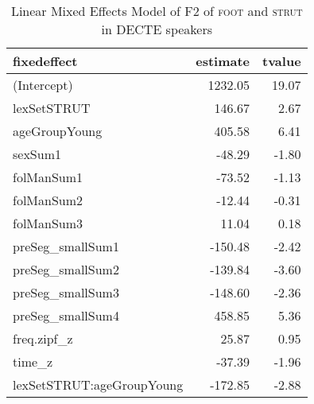 \begin{table}[ht]
\centering
\begin{tabular}{lrr}
  \hline
fixedeffect & estimate & tvalue \\ 
  \hline
(Intercept) & 1232.05 & 19.07 \\ 
  lexSetSTRUT & 146.67 & 2.67 \\ 
  ageGroupYoung & 405.58 & 6.41 \\ 
  sexSum1 & -48.29 & -1.80 \\ 
  folManSum1 & -73.52 & -1.13 \\ 
  folManSum2 & -12.44 & -0.31 \\ 
  folManSum3 & 11.04 & 0.18 \\ 
  preSeg\_smallSum1 & -150.48 & -2.42 \\ 
  preSeg\_smallSum2 & -139.84 & -3.60 \\ 
  preSeg\_smallSum3 & -148.60 & -2.36 \\ 
  preSeg\_smallSum4 & 458.85 & 5.36 \\ 
  freq.zipf\_z & 25.87 & 0.95 \\ 
  time\_z & -37.39 & -1.96 \\ 
  lexSetSTRUT:ageGroupYoung & -172.85 & -2.88 \\ 
   \hline
\end{tabular}
\caption{Linear Mixed Effects Model of F2 of \textsc{foot} and \textsc{strut} in DECTE speakers \label{tbl:FSF2DE}} 
\end{table}

